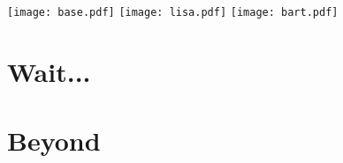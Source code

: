 \documentclass{beamer}
\begin{document}
\begin{frame}

	\begin{overprint}
		\centering
	\texttt{[image: base.pdf]}
	\onslide<2>\texttt{[image: lisa.pdf]}
	\onslide<3>\texttt{[image: bart.pdf]}
\end{overprint}
\end{frame}

\section{Wait...}

\section{Beyond}
\end{document}

